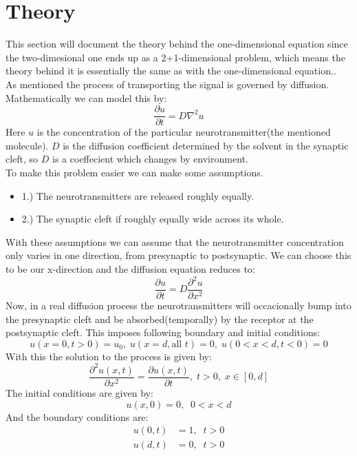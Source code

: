 \documentclass[a4paper,11pt]{article}
\newcommand{\prtl}{\partial} %
\newcommand{\vsp}{\vspace{0.2cm}} %
\newcommand{\secti}[1]{\centering \section{{#1}} \justifying} %
\begin{document}
\secti{Theory}
    This section will document the theory behind the one-dimensional equation since the two-dimesional one ends up as  a 2+1-dimensional problem, which means the theory behind it is essentially the same as with the one-dimensional equation..\vsp \\
    As mentioned the process of transporting the signal is governed by diffusion. Mathematically we can model this by:
    \begin{equation*}
        \frac{\prtl u}{\prtl t} = D\nabla^2 u
    \end{equation*}
    Here $u$ is the concentration of the particular neurotransmitter(the mentioned molecule). $D$ is the diffusion coefficient determined by the solvent in the synaptic cleft, so $D$ is a coeffecient which changes by environment.\vsp\\
    To make this problem easier we can make some assumptions.
        \begin{itemize}
            \item 1.) The neurotransmitters are released roughly equally.
            \item 2.) The synaptic cleft if roughly equally wide across its whole.
        \end{itemize}
    With these assumptions we can assume that the neurotransmitter concentration only varies in one direction, from presynaptic to postsynaptic. We can choose this to be our x-direction and the diffusion equation reduces to:
    \begin{equation*}
        \frac{\prtl u}{\prtl t} = D\frac{\prtl^2 u}{\prtl x^2}
    \end{equation*}
    Now, in a real diffusion process the neurotransmitters will occacionally bump into the presynaptic cleft and be absorbed(temporally) by the receptor at the postsynaptic cleft. This imposes following boundary and initial conditions:
    \begin{equation*}
        u(x=0,t>0)=u_0,\; u(x=d,\mbox{all $t$})=0,\; u(0<x<d, t<0)=0
    \end{equation*}
    With this the solution to the process is given by:
    \begin{equation*}
        \frac{\prtl^2 u(x,t)}{\prtl x^2} = \frac{\prtl u(x,t)}{\prtl t},\; t>0,\; x\in [0,d]
    \end{equation*}
    The initial conditions are given by:
    \begin{equation*}
        u(x,0) = 0,\;\; 0<x<d
    \end{equation*}
    And the boundary conditions are:
    \begin{align*}
        u(0,t) &= 1,\;\; t>0\\
        u(d,t) &= 0,\;\; t>0
    \end{align*}
\end{document}
